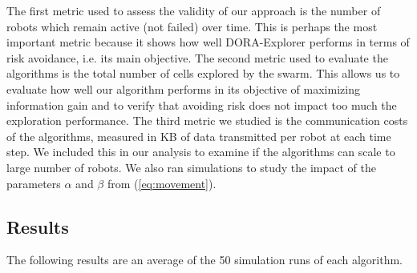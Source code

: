

The first metric used to assess the validity of our approach is the
number of robots which remain active (not failed) over time. This is
perhaps the most important metric because it shows how well DORA-Explorer
performs in terms of risk avoidance, i.e. its main objective. The
second metric used to evaluate the algorithms is the total number of
cells explored by the swarm. This allows us to evaluate how well our
algorithm performs in its objective of maximizing information gain and
to verify that avoiding risk does not impact too much the exploration
performance. The third metric we studied is the communication costs of
the algorithms, measured in KB of data transmitted per robot at
each time step. We included this in our analysis to examine if
the algorithms can scale to large number of robots. We also ran simulations to study the impact of the parameters $\alpha$ and $\beta$ from (\ref{eq:movement}). 


\subsection{Results}

The following results are an average of the 50 simulation runs of each algorithm. 

